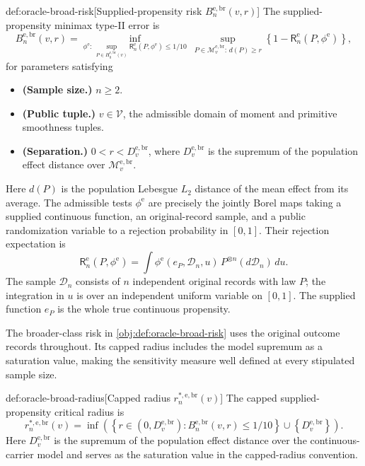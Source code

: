 \documentclass[11pt]{article}
\begin{document}
\begin{definitionv}{def:oracle-broad-risk}[Supplied-propensity risk \(B_n^{\mathrm{e,br}}(v,r)\)]
The supplied-propensity minimax type-II error is
\[
 B_n^{\mathrm{e,br}}(v,r)=
 \inf_{\phi^{\mathrm e}:\,
     \sup_{P\in H_0^{\mathrm{e,br}}(v)}
       \mathsf R_n^{\mathrm e}(P,\phi^{\mathrm e})\le1/10}
 \ \sup_{P\in\mathcal M_v^{\mathrm{e,br}}:\,d(P)\ge r}
       \left\{1-\mathsf R_n^{\mathrm e}(P,\phi^{\mathrm e})\right\},
\]
for parameters satisfying
\begin{itemize}
\item \textbf{(Sample size.)} \(n\ge2\).
\item \textbf{(Public tuple.)} \(v\in\mathcal V\), the admissible domain of moment and primitive smoothness tuples.
\item \textbf{(Separation.)} \(0<r<D_v^{\mathrm{e,br}}\), where \(D_v^{\mathrm{e,br}}\) is the supremum of the population effect distance over \(\mathcal M_v^{\mathrm{e,br}}\).
\end{itemize}
Here \(d(P)\) is the population Lebesgue \(L_2\) distance of the mean effect from its average. The admissible tests \(\phi^{\mathrm e}\) are precisely the jointly Borel maps taking a supplied continuous function, an original-record sample, and a public randomization variable to a rejection probability in \([0,1]\). Their rejection expectation is
\[
 \mathsf R_n^{\mathrm e}(P,\phi^{\mathrm e})
 =\int \phi^{\mathrm e}(e_P,\mathcal D_n,u)\,
       P^{\otimes n}(d\mathcal D_n)\,du.
\]
The sample \(\mathcal D_n\) consists of \(n\) independent original records with law \(P\); the integration in \(u\) is over an independent uniform variable on \([0,1]\). The supplied function \(e_P\) is the whole true continuous propensity.
\end{definitionv}

The broader-class risk  in \cref{obj:def:oracle-broad-risk} uses the original outcome records throughout. Its capped radius includes the model supremum as a saturation value, making the sensitivity measure well defined at every stipulated sample size.

\begin{definitionv}{def:oracle-broad-radius}[Capped radius \(r_n^{*,\mathrm{e,br}}(v)\)]
The capped supplied-propensity critical radius is
\[
 r_n^{*,\mathrm{e,br}}(v)=
 \inf\left(
 \left\{r\in(0,D_v^{\mathrm{e,br}}):
 B_n^{\mathrm{e,br}}(v,r)\le1/10\right\}
 \cup\left\{D_v^{\mathrm{e,br}}\right\}\right).
\]
Here \(D_v^{\mathrm{e,br}}\) is the supremum of the population effect distance over the continuous-carrier model and serves as the saturation value in the capped-radius convention.
\end{definitionv}
\end{document}
